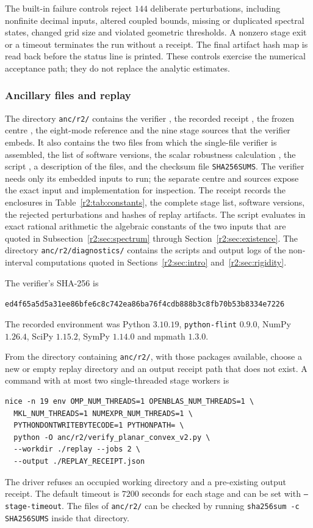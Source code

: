 The built-in failure controls reject $144$ deliberate perturbations, including nonfinite decimal inputs, altered coupled bounds, missing or duplicated spectral states, changed grid size and violated geometric thresholds. A nonzero stage exit or a timeout terminates the run without a receipt. The final artifact hash map is read back before the status line is printed. These controls exercise the numerical acceptance path; they do not replace the analytic estimates.

\subsubsection{Ancillary files and replay}
The directory \texttt{anc/r2/} contains the verifier , the recorded receipt , the frozen centre , the eight-mode reference  and the nine stage sources that the verifier embeds. It also contains the two files from which the single-file verifier is assembled, the list of software versions, the scalar robustness calculation , the script , a description of the files, and the checksum file \texttt{SHA256SUMS}. The verifier needs only its embedded inputs to run; the separate centre and sources expose the exact input and implementation for inspection. The receipt records the enclosures in Table~\ref{r2:tab:constants}, the complete stage list, software versions, the rejected perturbations and hashes of replay artifacts. The script  evaluates in exact rational arithmetic the algebraic constants of the two inputs that are quoted in Subsection~\ref{r2:sec:spectrum} through Section~\ref{r2:sec:existence}. The directory \texttt{anc/r2/diagnostics/} contains the scripts and output logs of the non-interval computations quoted in Sections~\ref{r2:sec:intro} and~\ref{r2:sec:rigidity}.

The verifier's SHA-256 is
\begin{center}
\texttt{\footnotesize ed4f65a5d5a31ee86bfe6c8c742ea86ba76f4cdb888b3c8fb70b53b8334e7226}
\end{center}
The recorded environment was Python $3.10.19$, \texttt{python-flint} $0.9.0$, NumPy $1.26.4$, SciPy $1.15.2$, SymPy $1.14.0$ and mpmath $1.3.0$.

From the directory containing \texttt{anc/r2/}, with those packages available, choose a new or empty replay directory and an output receipt path that does not exist. A command with at most two single-threaded stage workers is
\begin{verbatim}
nice -n 19 env OMP_NUM_THREADS=1 OPENBLAS_NUM_THREADS=1 \
  MKL_NUM_THREADS=1 NUMEXPR_NUM_THREADS=1 \
  PYTHONDONTWRITEBYTECODE=1 PYTHONPATH= \
  python -O anc/r2/verify_planar_convex_v2.py \
  --workdir ./replay --jobs 2 \
  --output ./REPLAY_RECEIPT.json
\end{verbatim}
The driver refuses an occupied working directory and a pre-existing output receipt. The default timeout is $7200$ seconds for each stage and can be set with \texttt{--stage-timeout}. The files of \texttt{anc/r2/} can be checked by running \texttt{sha256sum -c SHA256SUMS} inside that directory.

